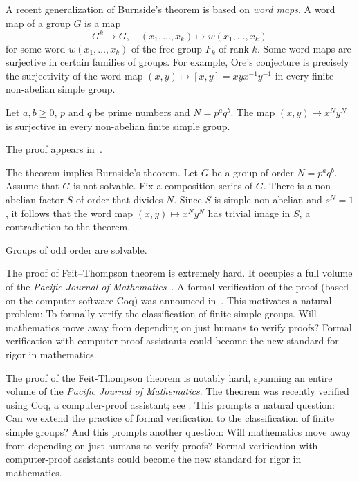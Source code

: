 A recent generalization of Burnside's theorem
is based on \emph{word maps}. A word map
of a group $G$ is a map 
\[
G^k\to G,\quad 
(x_1,\dots,x_k)\mapsto w(x_1,\dots,x_k)
\]
for some word $w(x_1,\dots,x_k)$ of the free group $F_k$ of rank $k$. 
Some word maps are surjective in certain families of groups. For example, 
Ore's conjecture is precisely the surjectivity of the word map
$(x,y)\mapsto [x,y]=xyx^{-1}y^{-1}$ in every finite non-abelian simple 
group. 

\begin{theorem}
    Let $a,b\geq0$, $p$ and $q$ be prime numbers and $N=p^aq^b$. The map 
    $(x,y)\mapsto x^Ny^N$ is surjective in every non-abelian 
    finite simple group. 
\end{theorem}

The proof appears in~\cite{MR3827208}. 

The theorem implies Burnside's theorem. Let $G$ be a group of order
$N=p^aq^b$. Assume that $G$ is not solvable. 
Fix a composition series of $G$. There is a non-abelian factor $S$ 
of order that divides $N$. Since 
$S$ is simple non-abelian and $s^N=1$, it follows that the word map
$(x,y)\mapsto x^Ny^N$ has trivial image in $S$, a contradiction 
to the theorem. 

\begin{theorem}
    Groups of odd order are solvable. 
\end{theorem}

The proof of Feit--Thompson theorem is extremely hard. 
It occupies a full volume of the 
\emph{Pacific Journal of Mathematics}~\cite{MR166261}. 
A formal verification of the proof 
(based on the computer software Coq) 
was announced in~\cite{MR3111271}.  This motivates a natural problem: To formally verify 
the classification of finite simple groups.  
Will mathematics move away from depending on just humans to verify proofs? Formal verification with computer-proof assistants 
could become the new standard for rigor in mathematics. 

The proof of the Feit-Thompson theorem is notably hard, spanning an entire volume of the \emph{Pacific Journal of Mathematics}\cite{MR166261}. The theorem was recently verified using Coq, a computer-proof assistant; see \cite{MR3111271}. 
This prompts a natural question: Can we extend the practice of formal verification to the classification of finite simple groups? And this prompts another question: Will mathematics move away from depending on just humans to verify proofs? Formal verification with computer-proof assistants 
could become the new standard for rigor in mathematics. 

